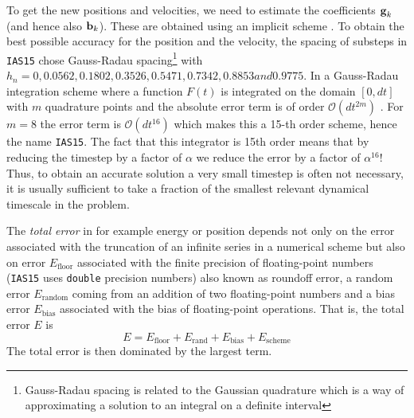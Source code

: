 To get the new positions and velocities, we need to estimate the coefficients
$\boldsymbol{\mathbf{g}}_k$ (and hence also $\boldsymbol{\mathbf{b}}_k$). These are obtained using an implicit
scheme
\citep[see][for details]{Rein2014}. To obtain the best possible accuracy for
the position and the velocity, the spacing of substeps in \texttt{IAS15} 
\cite{Rein2014} chose Gauss-Radau spacing\footnote{Gauss-Radau spacing is related to 
the Gaussian quadrature which is a way of approximating a solution to an 
integral on a definite interval} with $h_n=0, 0.0562, 0.1802, 0.3526, 
0.5471, 0.7342, 0.8853 and 0.9775$. In a Gauss-Radau integration scheme
where a function $F(t)$ is integrated on the domain $[0,dt]$ with $m$ quadrature
points and the absolute error term is of order $\mathcal{O}(dt^{2m})$
\cite{Rein2014}. 
For $m=8$ the error term is $\mathcal{O}(dt^{16})$ which makes this
a 15-th order scheme, hence the name \texttt{IAS15}. The fact that this
integrator is 15th order means that by reducing the timestep by a factor of
$\alpha$ we reduce the error by a factor of $\alpha^{16}$! Thus, to obtain
an accurate solution a very small timestep is often not necessary, it is
usually sufficient to take a fraction of the smallest relevant dynamical
timescale in the problem.

The \emph{total error} in for example energy or position 
depends not only on the error associated
with the truncation of an infinite series in a numerical scheme but also
on error $E_\text{floor}$ associated with the finite precision of 
floating-point numbers 
(\texttt{IAS15} uses \texttt{double} precision numbers) also known as
roundoff error, a random error 
$E_\text{random}$ coming from an addition of two floating-point numbers 
and a bias error $E_\text{bias}$ associated
with the bias of floating-point operations. That is, the total error $E$ is
\begin{equation}
    E=E_\text{floor}+E_\text{rand}+E_\text{bias}+E_\text{scheme}
\end{equation}
The total error is then dominated by the largest term. 

